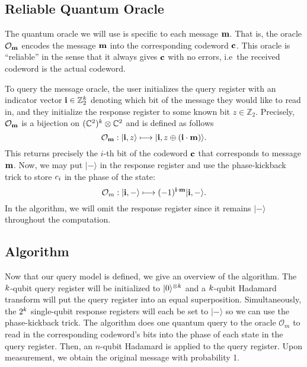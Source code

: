 \documentclass[12pt,twoside]{reedthesis}
\theoremstyle{definition}
\newcommand{\Z}{\mathbb{Z}}
\newcommand{\C}{\mathbb{C}}
\newcommand{\ket}[1]{\ensuremath{\lvert #1\rangle}\xspace}
\newcommand{\Hminus}{\ensuremath{\lvert- \rangle}\xspace}
\begin{document}
\subsection{Reliable Quantum Oracle}
The quantum oracle we will use is specific to each message $\mathbf{m}$. That is, the oracle $\mathcal{O}_\mathbf{m}$ encodes the message $\mathbf{m}$ into the corresponding codeword $\mathbf{c}$. This oracle is ``reliable'' in the sense that it always gives $\mathbf{c}$ with no errors, i.e~the received codeword is the actual codeword. 

To query the message oracle, the user initializes the query register with an indicator vector $\mathbf{i} \in \Z_2^\mlen$ denoting which bit of the message they would like to read in, and they initialize the response register to some known bit $z\in\Z_2$. Precisely, $\mathcal{O}_\mathbf{m}$ is a bijection on $(\C^2)^\mlen \otimes \C^2$ and is defined as follows
\begin{equation*}
\mathcal{O}_\mess: \ket{\mathbf{i}, \rr} \longmapsto \ket{\mathbf{i}, \rr \oplus (\mathbf{i} \cdot \mess)}.
\end{equation*} 
This returns precisely the $i$-th bit of the codeword $\mathbf{c}$ that corresponds to message $\mathbf{m}$. Now, we may put $\Hminus$ in the response register and use the phase-kickback trick to store $c_{i}$ in the phase of the state:
\begin{equation*}
\mathcal{O}_m: \ket{\mathbf{i}, -} \longmapsto (-1)^{\mathbf{i} \cdot \mess}\ket{\mathbf{i},-}.
\end{equation*}
In the algorithm, we will omit the response register since it remains $\Hminus$ throughout the computation.
\subsection{Algorithm}

Now that our query model is defined, we give an overview of the algorithm. The $k$-qubit query register will be initialized to $\ket{0}^{\otimes \mlen}$ and a $k$-qubit Hadamard transform will put the query register into an equal superposition. Simultaneously, the $2^k$ single-qubit response registers will each be set to $\Hminus$ so we can use the phase-kickback trick. The algorithm does one quantum query to the oracle $\mathcal{O}_m$ to read in the corresponding codeword's bits into the phase of each state in the query register. Then, an $n$-qubit Hadamard is applied to the query register. Upon measurement, we obtain the original message with probability 1.
\end{document}
